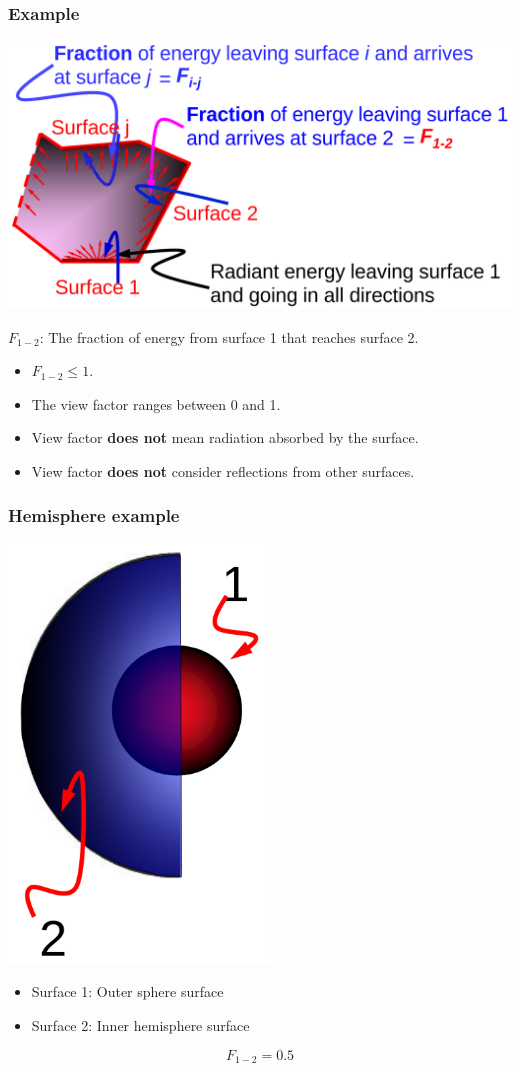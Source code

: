 \documentclass[11pt]{article}
\begin{document}
\subsubsection{Example}
\label{sec:org0d8874a}
\begin{center}
\includegraphics[width=.9\linewidth]{./images/view-factor-diagram-with-explanation.png}
\end{center}

\(F_{1-2}\): The fraction of energy from surface 1 that reaches surface 2.
\begin{itemize}
\item \(F_{1-2} \le 1\).
\item The view factor ranges between 0 and 1.
\item View factor \textbf{does not} mean radiation absorbed by the surface.
\item View factor \textbf{does not} consider reflections from other surfaces.
\end{itemize}
\subsubsection{Hemisphere example}
\label{sec:orgcdc8f6a}
\begin{center}
\includegraphics[height=30em]{./images/view-factor-hemisphere-example-diagram.png}
\end{center}
\begin{itemize}
\item Surface 1: Outer sphere surface
\item Surface 2: Inner hemisphere surface
\end{itemize}
\[F_{1-2} = 0.5\]
\end{document}
